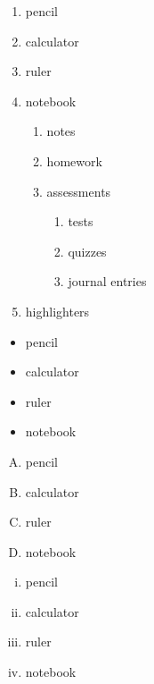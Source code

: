 \documentclass[11pt]{article}
\begin{document}
\begin{enumerate}
    \item pencil
    \item calculator
    \item ruler
    \item notebook
    \begin{enumerate}
        \item notes
        \item homework
        \item assessments
            \begin{enumerate}
                \item tests
                \item quizzes
                \item journal entries
            \end{enumerate}
    \end{enumerate}
    \item highlighters
\end{enumerate}


\begin{itemize}
    \item pencil
    \item calculator
    \item ruler
    \item notebook
\end{itemize}

\vspace{1cm}

\begin{enumerate}[A.] %
    \item pencil
    \item calculator
    \item ruler
    \item notebook
\end{enumerate}


\vspace{1cm}

\begin{enumerate}[i.] %
    \item pencil
    \item calculator
    \item ruler
    \item notebook
\end{enumerate}


\vspace{1cm}
\end{document}
